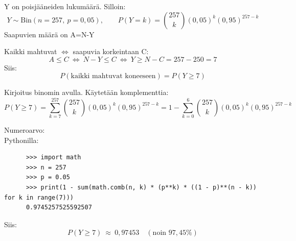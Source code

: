 \documentclass[12pt,a4paper]{article}
\begin{document}
\begin{alakohta}
  \item Y on poisjääneiden lukumäärä. Silloin:
  \[
    Y \sim \mathrm{Bin}(n=257,\ p=0{,}05),\qquad
    P(Y=k)=\binom{257}{k}(0{,}05)^k(0{,}95)^{257-k}
  \]
  Saapuvien määrä on A=N-Y

  \item Kaikki mahtuvat $\iff$ saapuvia korkeintaan C:
  \[
    A \le C\ \Longleftrightarrow\ N - Y \le C\ \Longleftrightarrow\ Y \ge N-C = 257-250=7
  \]
  Siis:
  \[
    P(\text{kaikki mahtuvat koneeseen})=P(Y\ge 7)
  \]

  \item Kirjoitus binomin avulla. Käytetään komplementtia:
  \[
    P(Y\ge 7)
    = \sum_{k=7}^{257}\binom{257}{k}(0{,}05)^k(0{,}95)^{257-k}
    = 1 - \sum_{k=0}^{6}\binom{257}{k}(0{,}05)^k(0{,}95)^{257-k}
  \]

  \item Numeroarvo:\\

   Pythonilla:
   {\small
   \begin{verbatim}
      >>> import math
      >>> n = 257
      >>> p = 0.05
      >>> print(1 - sum(math.comb(n, k) * (p**k) * ((1 - p)**(n - k)) for k in range(7)))
      0.9745257525592507
   \end{verbatim}
   }

   Siis:
  \[
    P(Y\ge 7)\ \approx\ 0{,}97453 \quad (\text{noin }97{,}45\%)
  \]


\end{alakohta}
\end{document}
